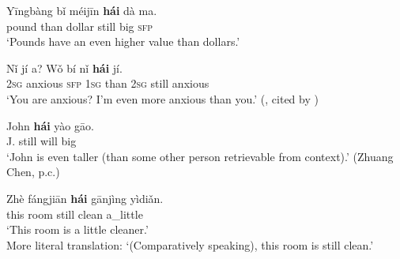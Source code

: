 \begin{exe}
	\ex\label{exAppendixMandarinComparison1}
	\gll Yīngbàng	bǐ	méijīn	\textbf{hái}	dà	ma.\\
	pound than dollar still big \textsc{sfp}\\
	\glt \lq{}Pounds have an even higher value than dollars.' \parencite[62]{Lu2019}
	
	\ex\label{exAppendixMandarinComparison2}
	\gll Nǐ	jí	a?	Wǒ	bí	nǐ	\textbf{hái}	jí.\\
	2\textsc{sg} anxious \textsc{sfp} 1\textsc{sg} than 2\textsc{sg} still anxious\\
	\glt \lq You are anxious? I’m even more anxious than you.' (\cite{LiuEtAl2001}, cited by \cite[53]{JingSchmidtGries2009})

	\ex\label{exAppendixMandarinComparison3}
	\gll John	\textbf{hái}	yào	gāo.\\
	J. still will big\\
	\glt \lq John is even taller (than some other person retrievable from context).\rq{ } (Zhuang Chen, p.c.)
	
	\ex\label{exAppendixMandarinComparison4}
	\gll Zhè	fángjiān	\textbf{hái}	gānjìng	yìdiǎn.\\
	this room still clean a\_little\\
	\glt \lq This room is a little cleaner.' \parencite[66]{Liu2000}\\
	More literal translation: \lq (Comparatively speaking), this room is still clean.'
\end{exe}


